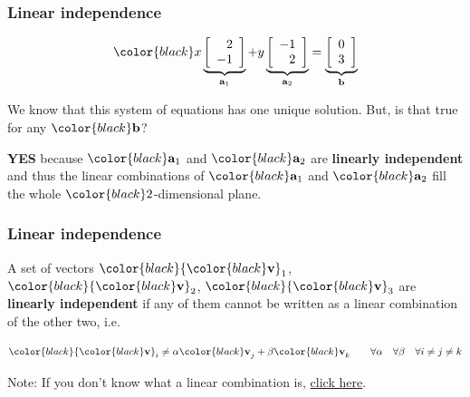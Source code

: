 \documentclass[compress]{beamer}
\newcommand{\black}[1]{{\color{black}#1}}
\renewcommand{\emph}[1]{\textbf{\black{#1}}}
\newcommand{\beq}[1]{\[\black{#1}\]}
\renewcommand{\v}{\black{\mathbf{v}}}
\begin{document}
\begin{frame}
\frametitle{Linear independence}

\beq{
x\underbrace{\left[
\begin{array}{r}
2\\
-1
\end{array}
\right]}_{\a_1}+y
\underbrace{\left[
\begin{array}{r}
-1\\
2
\end{array}
\right]}_{\a_2} = \underbrace{\left[
\begin{array}{c}
0\\ 
3
\end{array}
\right]}_{\b}
}

We know that this system of equations has one unique solution. But, is that true for any $\black{\b}$?

\vspace{1cm}
\emph{YES} because $\black{\a_1}$ and $\black{\a_2}$ are \emph{linearly independent} and thus the linear combinations of $\black{\a_1}$ and $\black{\a_2}$ fill the whole $\black{2}$-dimensional plane.

\end{frame}


\begin{frame}
\frametitle{Linear independence}

A set of vectors $\black{\v_1}$, $\black{\v_2}$, $\black{\v_3}$ are \emph{linearly independent} if any of them cannot be written as a linear combination of the other two, i.e.

\beq{
\v_i \neq \alpha\v_j + \beta\v_k \qquad  \forall \alpha \quad \forall \beta \quad \forall i\neq j \neq k
}

\vspace{2cm}

\tiny{\black{Note:} If you don't know what a linear combination is, \href{http://en.wikipedia.org/wiki/Linear_combination}{click here}.}


\end{frame}

\end{document}
